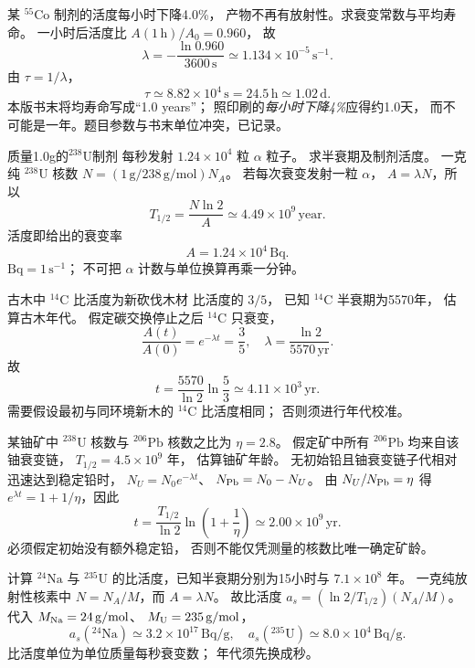 某 $\mathrm{^{55}Co}$ 制剂的活度每小时下降4.0\%，
产物不再有放射性。求衰变常数与平均寿命。
\exsolution
一小时后活度比
$A(1\,\mathrm h)/A_0=0.960$，
故
\[
 \boxed{\lambda=-\frac{\ln0.960}{3600\,\mathrm s}
 \simeq1.134\times10^{-5}\,\mathrm{s^{-1}}}.
\]
由 $\tau=1/\lambda$，
\[
 \boxed{\tau\simeq8.82\times10^4\,\mathrm s
 =24.5\,\mathrm h\simeq1.02\,\mathrm d}.
\]
\excheck 本版书末将均寿命写成“1.0 years”；
照印刷的\emph{每小时下降4\%}应得约1.0天，
而不可能是一年。题目参数与书末单位冲突，已记录。

质量1.0g的$\mathrm{^{238}U}$制剂
每秒发射 $1.24\times10^4$ 粒 $\alpha$ 粒子。
求半衰期及制剂活度。
\exsolution
一克纯 $\mathrm{^{238}U}$ 核数
$N=(1\,\mathrm g/238\,\mathrm{g/mol})N_A$。
若每次衰变发射一粒 $\alpha$，
$A=\lambda N$，所以
\[
 \boxed{T_{1/2}=\frac{N\ln2}{A}
 \simeq4.49\times10^9\,\mathrm{year}}.
\]
活度即给出的衰变率
\[
 \boxed{A=1.24\times10^4\,\mathrm{Bq}}.
\]
\excheck $\mathrm{Bq}=1\,\mathrm{s^{-1}}$；
不可把 $\alpha$ 计数与单位换算再乘一分钟。

古木中 $\mathrm{^{14}C}$ 比活度为新砍伐木材
比活度的 $3/5$，
已知 $\mathrm{^{14}C}$ 半衰期为5570年，
估算古木年代。
\exsolution
假定碳交换停止之后 $\mathrm{^{14}C}$ 只衰变，
\[
 \frac{A(t)}{A(0)}=e^{-\lambda t}=\frac35,\quad
 \lambda=\frac{\ln2}{5570\,\mathrm{yr}}.
\]
故
\[
 \boxed{t=\frac{5570}{\ln2}\ln\frac53
 \simeq4.11\times10^3\,\mathrm{yr}}.
\]
\excheck 需要假设最初与同环境新木的
$\mathrm{^{14}C}$ 比活度相同；
否则须进行年代校准。

某铀矿中 $\mathrm{^{238}U}$ 核数与
$\mathrm{^{206}Pb}$ 核数之比为
$\eta=2.8$。
假定矿中所有 $\mathrm{^{206}Pb}$
均来自该铀衰变链，
$T_{1/2}=4.5\times10^9$ 年，
估算铀矿年龄。
\exsolution
无初始铅且铀衰变链子代相对迅速达到稳定铅时，
$N_U=N_0e^{-\lambda t}$、
$N_{\rm Pb}=N_0-N_U$。
由 $N_U/N_{\rm Pb}=\eta$ 得
$e^{\lambda t}=1+1/\eta$，因此
\[
 \boxed{t=\frac{T_{1/2}}{\ln2}
 \ln\left(1+\frac1\eta\right)
 \simeq2.00\times10^9\,\mathrm{yr}}.
\]
\excheck 必须假定初始没有额外稳定铅，
否则不能仅凭测量的核数比唯一确定矿龄。

计算 $\mathrm{^{24}Na}$ 与 $\mathrm{^{235}U}$
的比活度，已知半衰期分别为15小时与
$7.1\times10^8$ 年。
\exsolution
一克纯放射性核素中
$N=N_A/M$，而 $A=\lambda N$。
故比活度
$a_s=(\ln2/T_{1/2})(N_A/M)$。
代入 $M_{\rm Na}=24\,\mathrm{g/mol}$、
$M_{\rm U}=235\,\mathrm{g/mol}$，
\[
 \boxed{a_s(\mathrm{^{24}Na})\simeq
 3.2\times10^{17}\,\mathrm{Bq/g}},
\quad
 \boxed{a_s(\mathrm{^{235}U})\simeq
 8.0\times10^{4}\,\mathrm{Bq/g}}.
\]
\excheck 比活度单位为单位质量每秒衰变数；
年代须先换成秒。

